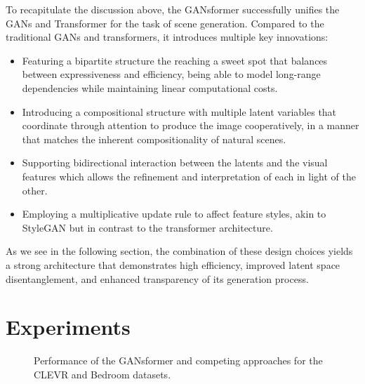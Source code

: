 \documentclass{article}
\begin{document}
To recapitulate the discussion above, the GANsformer successfully unifies the GANs and Transformer for the task of scene generation. Compared to the traditional GANs and transformers, it introduces multiple key innovations:
\begin{itemize}
  \item Featuring a bipartite structure the reaching a sweet spot that balances between expressiveness and efficiency, being able to model long-range dependencies while maintaining linear computational costs.
  \item Introducing a compositional structure with multiple latent variables that coordinate through attention to produce the image cooperatively, in a manner that matches the inherent compositionality of natural scenes.
  \item Supporting bidirectional interaction between the latents and the visual features which allows the refinement and interpretation of each in light of the other.
  \item Employing a multiplicative update rule to affect feature styles, akin to StyleGAN but in contrast to the transformer architecture.
\end{itemize}
As we see in the following section, the combination of these design choices yields a strong architecture that demonstrates high efficiency, improved latent space disentanglement, and enhanced transparency of its generation process.

%
 \section{Experiments}
\label{exps}

\begin{figure}[t]
\centering
{}
\hfill
{}
\vspace*{-2mm}
\caption{Performance of the GANsformer and competing approaches for the CLEVR and Bedroom datasets. }
\label{aplots}
\vspace*{-12pt}
\end{figure}
\end{document}
